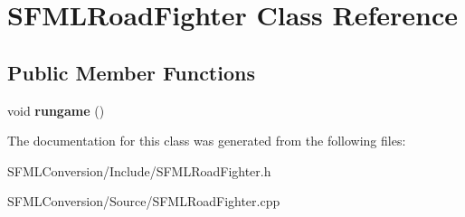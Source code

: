 \hypertarget{classSFMLRoadFighter}{}\section{S\+F\+M\+L\+Road\+Fighter Class Reference}
\label{classSFMLRoadFighter}
\subsection*{Public Member Functions}
\begin{DoxyCompactItemize}
\item 
\mbox{\label{classSFMLRoadFighter_a0f3bf2fc0d057aac66fbc68d87fba175}} 
void {\bfseries rungame} ()
\end{DoxyCompactItemize}


The documentation for this class was generated from the following files\+:\begin{DoxyCompactItemize}
\item 
S\+F\+M\+L\+Conversion/\+Include/S\+F\+M\+L\+Road\+Fighter.\+h\item 
S\+F\+M\+L\+Conversion/\+Source/S\+F\+M\+L\+Road\+Fighter.\+cpp\end{DoxyCompactItemize}
